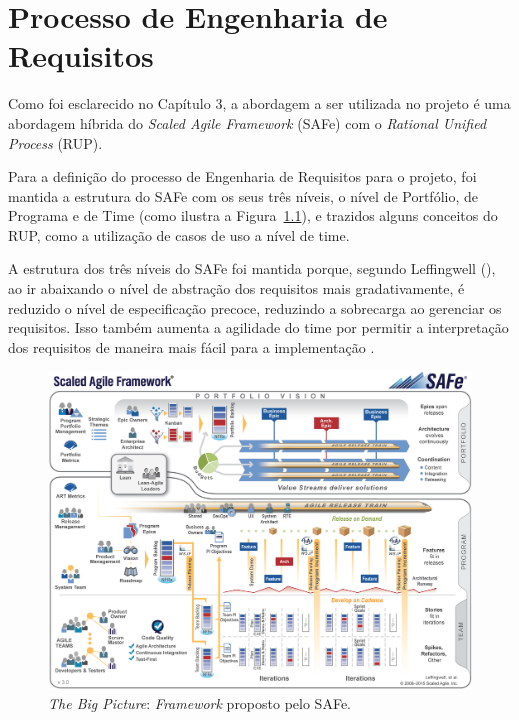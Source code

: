 \chapter[Processo de Engenharia de Requisitos]{Processo de Engenharia de Requisitos}
  
  Como foi esclarecido no Capítulo 3, a abordagem a ser utilizada no projeto é uma abordagem híbrida do 
  \textit{Scaled Agile Framework} (SAFe) com o \textit{Rational Unified Process} (RUP).
  
  Para a definição do processo de Engenharia de Requisitos para o projeto, foi mantida a estrutura do SAFe com os seus três níveis,
  o nível de Portfólio, de Programa e de Time (como ilustra a Figura~\ref{safe_big_picture}), e trazidos alguns
  conceitos do RUP, como a utilização de casos de uso a nível de time.
  
  A estrutura dos três níveis do SAFe foi mantida porque, segundo Leffingwell (\citeyear{leffingwell11}),
  ao ir abaixando o nível de abstração dos requisitos mais gradativamente, é reduzido o nível de especificação precoce,
  reduzindo a sobrecarga ao gerenciar os requisitos. Isso também aumenta a agilidade do time por permitir a interpretação
  dos requisitos de maneira mais fácil para a implementação \cite{leffingwell11}.
  
  \begin{figure}[!htbp]
    \centering
    \includegraphics[scale=0.11]{editaveis/figuras/SAFe_Big_Picture}
    \caption[The SAFe Big Picture]{\textit{The Big Picture}: \textit{Framework} proposto pelo SAFe\textregistered. \footnotemark}
    \label{safe_big_picture}
  \end{figure}
  
